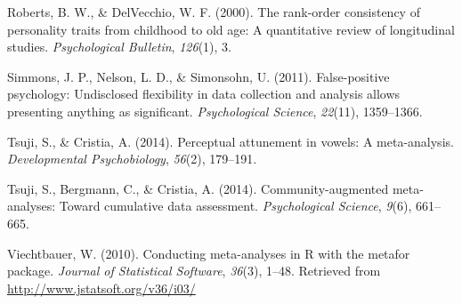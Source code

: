 \documentclass[english,floatsintext,man]{apa6}
\begin{document}
\hypertarget{ref-roberts2000rank}{}
Roberts, B. W., \& DelVecchio, W. F. (2000). The rank-order consistency
of personality traits from childhood to old age: A quantitative review
of longitudinal studies. \emph{Psychological Bulletin}, \emph{126}(1),
3.

\hypertarget{ref-Simmons2011}{}
Simmons, J. P., Nelson, L. D., \& Simonsohn, U. (2011). False-positive
psychology: Undisclosed flexibility in data collection and analysis
allows presenting anything as significant. \emph{Psychological Science},
\emph{22}(11), 1359--1366.

\hypertarget{ref-InPhonDB}{}
Tsuji, S., \& Cristia, A. (2014). Perceptual attunement in vowels: A
meta-analysis. \emph{Developmental Psychobiology}, \emph{56}(2),
179--191.

\hypertarget{ref-Tsuji2014}{}
Tsuji, S., Bergmann, C., \& Cristia, A. (2014). Community-augmented
meta-analyses: Toward cumulative data assessment. \emph{Psychological
Science}, \emph{9}(6), 661--665.

\hypertarget{ref-metafor}{}
Viechtbauer, W. (2010). Conducting meta-analyses in R with the metafor
package. \emph{Journal of Statistical Software}, \emph{36}(3), 1--48.
Retrieved from \url{http://www.jstatsoft.org/v36/i03/}
\end{document}
